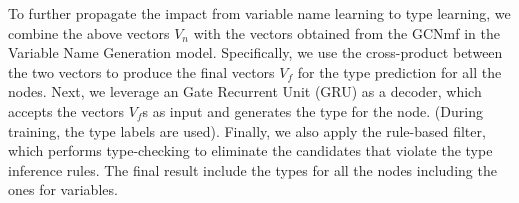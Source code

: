 To further propagate the impact from variable name learning to type
learning, we combine the above vectors $V_n$ with the vectors obtained
from the GCNmf in the Variable Name Generation model. Specifically, we
use the cross-product between the two vectors to produce the final
vectors $V_f$ for the type prediction for all the nodes. Next, we
leverage an Gate Recurrent Unit (GRU) as a decoder, which accepts the
vectors $V_f$s as input and generates the type for the node. (During
training, the type labels are used). Finally, we also apply the
rule-based filter, which performs type-checking to eliminate the
candidates that violate the type inference rules. The final
result include the types for all the nodes including the ones for
variables.








